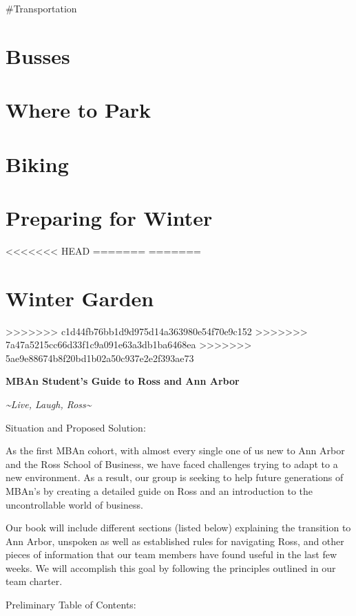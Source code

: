 \documentclass[
]{book}
\begin{document}
\#Transportation

\hypertarget{busses}{%
\section{Busses}\label{busses}}

\hypertarget{where-to-park}{%
\section{Where to Park}\label{where-to-park}}

\hypertarget{biking}{%
\section{Biking}\label{biking}}

\hypertarget{preparing-for-winter}{%
\section{Preparing for Winter}\label{preparing-for-winter}}
<<<<<<< HEAD
=======
=======
\hypertarget{winter-garden}{%
\section{Winter Garden}\label{winter-garden}}
>>>>>>> c1d44fb76bb1d9d975d14a363980e54f70e9c152
>>>>>>> 7a47a5215cc66d33f1c9a091e63a3db1ba6468ea
>>>>>>> 5ae9e88674b8f20bd1b02a50c937e2e2f393ae73

\textbf{MBAn Student's Guide to Ross and Ann Arbor}

\emph{\textasciitilde Live, Laugh, Ross\textasciitilde{}}

Situation and Proposed Solution:

As the first MBAn cohort, with almost every single one of us new to Ann Arbor and the Ross School of Business, we have faced challenges trying to adapt to a new environment. As a result, our group is seeking to help future generations of MBAn's by creating a detailed guide on Ross and an introduction to the uncontrollable world of business.

Our book will include different sections (listed below) explaining the transition to Ann Arbor, unspoken as well as established rules for navigating Ross, and other pieces of information that our team members have found useful in the last few weeks. We will accomplish this goal by following the principles outlined in our team charter.

Preliminary Table of Contents:
\end{document}
